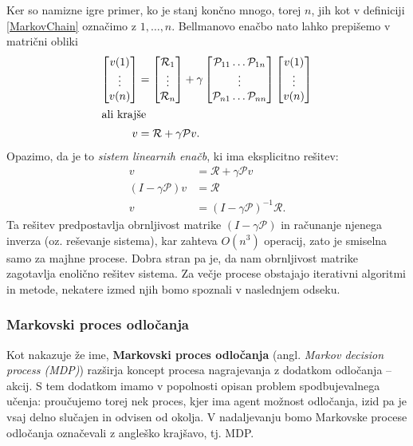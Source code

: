 \documentclass[12pt,a4paper]{amsart}
\theoremstyle{definition} %
\theoremstyle{plain} %
\begin{document}
Ker so namizne igre primer, ko je stanj končno mnogo, torej $n$, jih kot v definiciji \ref{MarkovChain}
označimo z $1, \dots, n$. Bellmanovo enačbo nato lahko prepišemo v matrični obliki
\begin{align*}
    \begin{bmatrix}
        v(1) \\ 
        \vdots \\ 
        v(n)
    \end{bmatrix}
    &=
    \begin{bmatrix}
        \mathcal{R}_1 \\ 
        \vdots \\ 
        \mathcal{R}_n 
    \end{bmatrix}
    + \gamma
    \begin{bmatrix}
        \mathcal{P}_{11} \dots \mathcal{P}_{1n} \\ 
        \vdots \\ 
        \mathcal{P}_{n1} \dots \mathcal{P}_{nn}
    \end{bmatrix}
    \begin{bmatrix}
        v(1) \\ 
        \vdots \\ 
        v(n)
    \end{bmatrix} \\
    \intertext{ali krajše}
    v &= \mathcal{R} + \gamma \mathcal{P}v.
\end{align*}
Opazimo, da je to \textit{sistem linearnih enačb}, ki ima eksplicitno rešitev: 
\begin{align*}
    v &= \mathcal{R} + \gamma \mathcal{P}v \\
    (I - \gamma \mathcal{P}) v &= \mathcal{R} \\
    v &= (I - \gamma \mathcal{P})^{-1} \mathcal{R}.
\end{align*}
Ta rešitev predpostavlja obrnljivost matrike $(I - \gamma \mathcal{P})$ in računanje njenega 
inverza (oz. reševanje sistema), kar zahteva $O(n^3)$ operacij, zato je smiselna samo za majhne 
procese. Dobra stran pa je, da nam obrnljivost matrike zagotavlja enolično rešitev sistema. Za večje 
procese obstajajo iterativni algoritmi in metode, nekatere izmed njih bomo spoznali v naslednjem odseku.

\subsubsection{Markovski proces odločanja}
Kot nakazuje že ime, \textbf{Markovski proces odločanja} (angl. \textit{Markov decision process (MDP)}) 
razširja koncept procesa nagrajevanja z dodatkom odločanja -- akcij. S tem dodatkom imamo v popolnosti 
opisan problem spodbujevalnega učenja: proučujemo torej nek proces, kjer ima agent možnost odločanja, 
izid pa je vsaj delno slučajen in odvisen od okolja. V nadaljevanju bomo Markovske procese odločanja 
označevali z angleško krajšavo, tj. MDP.
\end{document}
